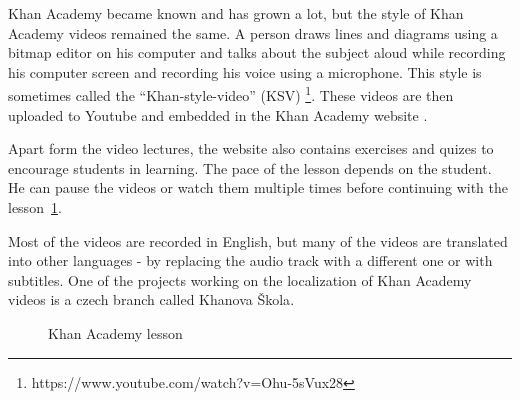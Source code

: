 Khan Academy became known and has grown a lot, but the style of Khan Academy videos remained the same. A person draws lines and diagrams using a bitmap editor on his computer and talks about the subject aloud while recording his computer screen and recording his voice using a microphone. This style is sometimes called the ``Khan-style-video'' (KSV) \footnote{https://www.youtube.com/watch?v=Ohu-5sVux28}. These videos are then uploaded to Youtube and embedded in the Khan Academy website \cite{khan_academy}.

Apart form the video lectures, the website also contains exercises and quizes to encourage students in learning. The pace of the lesson depends on the student. He can pause the videos or watch them multiple times before continuing with the lesson~\ref{fig:khan-screen}.

Most of the videos are recorded in English, but many of the videos are translated into other languages - by replacing the audio track with a different one or with subtitles. One of the projects working on the localization of Khan Academy videos is a czech branch called Khanova Škola\cite{khanova_skola}.

\begin{figure}
	\centering
	\caption{Khan Academy lesson}
	\label{fig:khan-screen}
\end{figure}